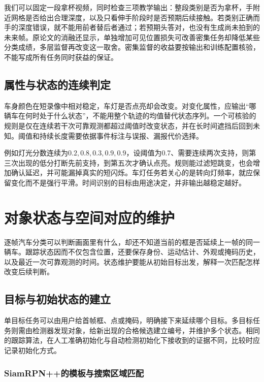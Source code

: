 我们可以固定一段拿杯视频，同时检查三项教学输出：整段类别是否为拿杯，手附近网格是否给出合理深度，以及只看伸手阶段时是否预期后续接触。若类别正确而手的深度错误，就不能用前者替后者通过；若预期头答对，也没有生成尚未拍到的未来帧。原论文的消融还显示，单独增加可见位置损失可改善密集任务却降低某些分类成绩，多层监督再改变这一取舍。密集监督的收益要按输出和训练配置核验，不能写成所有任务同时获益的保证。

\subsection{属性与状态的连续判定}
\label{sec:vision-video-continuous-attributes}

车身颜色在短录像中相对稳定，车灯是否点亮却会改变。对变化属性，应输出“哪辆车在何时处于什么状态”，不能用整个轨迹的均值替代状态序列。一个可核验的规则是仅在连续若干次可靠观测都超过阈值时改变状态，并在长时间遮挡后回到未知。阈值和持续长度需要依据事件标注与误报、漏报代价选择。

例如灯光分数连续为$0.2,0.8,0.3,0.9,0.9$，设阈值为0.7、需要连续两次支持，则第三次出现的低分打断先前支持，到第五次才确认点亮。规则能过滤短跳变，也会增加确认延迟，并可能漏掉真实的短闪烁。车灯任务若关心的是转向灯频率，就应保留变化而不是强行平滑。时间识别的目标由用途决定，并非输出越稳定越好。

\section{对象状态与空间对应的维护}
\label{sec:vision-video-tracking}

逐帧汽车分类可以判断画面里有什么，却还不知道当前的框是否延续上一帧的同一辆车。跟踪状态因而不仅包含位置，还要保存身份、运动估计、外观或掩码历史，以及最近一次可靠观测的时间。状态维护要能从初始目标出发，解释一次匹配怎样改变后续判断。

\subsection{目标与初始状态的建立}
\label{sec:vision-video-initialization}

单目标任务可以由用户给首帧框、点或掩码，明确接下来延续哪个目标。多目标任务则需由检测器发现对象，给新出现的合格候选建立编号，并维护多个状态。相同的跟踪算法，在人工准确初始化与自动检测初始化下接收到的证据不同，比较时应记录初始化方式。

\subsubsection{SiamRPN++的模板与搜索区域匹配}
\label{sec:vision-video-siamrpn}

